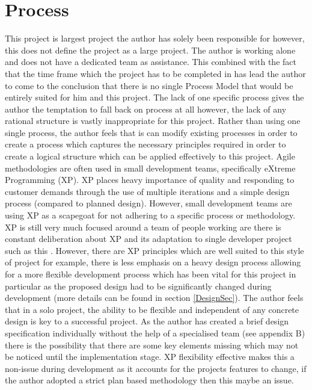 
\chapter{Process}
\label{processSec}
This project is largest project the author has solely been responsible for however, this does not define the project as a large project. The author is working alone and does not have a dedicated team as assistance. This combined with the fact that the time frame which the project has to be completed in has lead the author to come to the conclusion that there is no single Process Model that would be entirely suited for him and this project. The lack of one specific process gives the author the temptation to fall back on process at all however, the lack of any rational structure is vastly inappropriate for this project.
Rather than using one single process, the author feels that is can modify existing processes in order to create a process which captures the necessary principles required in order to create a logical structure which can be applied effectively to this project. Agile methodologies are often used in small development teams, specifically eXtreme Programming (XP). XP places heavy importance of quality and responding to customer demands through the use of multiple iterations and a simple design process (compared to planned design). However, small development teams are using XP as a scapegoat for not adhering to a specific process or methodology. XP is still very much focused around a team of people working are there is constant deliberation about XP and its adaptation to single developer project such as this \cite{XP:forone}. However, there are XP principles which are well suited to this style of project for example, there is less emphasis on a heavy design process allowing for a more flexible development process which has been vital for this project in particular as the proposed design had to be significantly changed during development (more details can be found in section \ref{DesignSec}). The author feels that in a solo project, the ability to be flexible and independent of any concrete design is key to a successful project. As the author has created a brief design specification individually without the help of a specialised team (see appendix B) there is the possibility that there are some key elements missing which may not be noticed until the implementation stage. XP flexibility effective makes this a non-issue during development as it accounts for the projects features to change, if the author adopted a strict plan based methodology then this maybe an issue.

